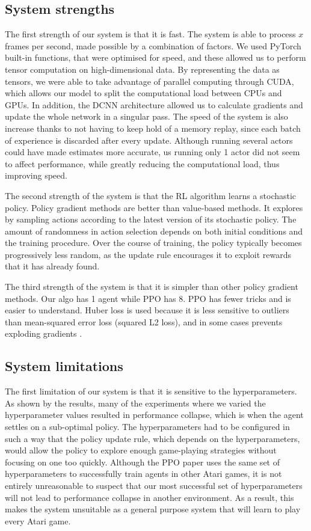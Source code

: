 \documentclass[12pt,a4paper]{article}
\begin{document}
\subsection{System strengths} 
The first strength of our system is that it is fast. The system is able to process $x$ frames per second, made possible by a combination of factors. We used PyTorch built-in functions, that were optimised for speed, and these allowed us to perform tensor computation on high-dimensional data. By representing the data as tensors, we were able to take advantage of parallel computing through CUDA, which allows our model to split the computational load between CPUs and GPUs. In addition, the DCNN architecture allowed us to calculate gradients and update the whole network in a singular pass. The speed of the system is also increase thanks to not having to keep hold of a memory replay, since each batch of experience is discarded after every update. Although running several actors could have made estimates more accurate, us running only 1 actor did not seem to affect performance, while greatly reducing the computational load, thus improving speed.

The second strength of the system is that the RL algorithm learns a stochastic policy. Policy gradient methods are better than value-based methods. It explores by sampling actions according to the latest version of its stochastic policy. The amount of randomness in action selection depends on both initial conditions and the training procedure. Over the course of training, the policy typically becomes progressively less random, as the update rule encourages it to exploit rewards that it has already found. 

The third strength of the system is that it is simpler than other policy gradient methods. Our algo has 1 agent while PPO has 8. PPO has fewer tricks and is easier to understand. Huber loss is used because it is less sensitive to outliers than mean-squared error loss (squared L2 loss), and in some cases prevents exploding gradients \cite{DBLP:journals/corr/Girshick15}.

\subsection{System limitations}
The first limitation of our system is that it is sensitive to the hyperparameters. As shown by the results, many of the experiments where we varied the hyperparameter values resulted in performance collapse, which is when the agent settles on a sub-optimal policy. The hyperparameters had to be configured in such a way that the policy update rule, which depends on the hyperparameters, would allow the policy to explore enough game-playing strategies without focusing on one too quickly. Although the PPO paper uses the same set of hyperparameters to successfully train agents in other Atari games, it is not entirely unreasonable to suspect that our most successful set of hyperparameters will not lead to performance collapse in another environment. As a result, this makes the system unsuitable as a general purpose system that will learn to play every Atari game. 
\end{document}
